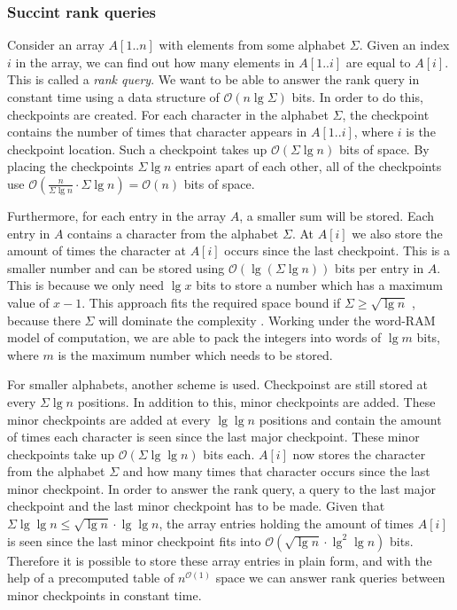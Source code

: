 \subsubsection{Succint rank queries}
\label{sssect:succintrank}
Consider an array $A[1..n]$ with elements from some alphabet $\Sigma$. Given an index $i$ in the array, we can find out how many elements in $A[1..i]$ are equal to $A[i]$. This is called a \emph{rank query}. We want to be able to answer the rank query in constant time using a data structure of $\mathcal{O}(n \lg \Sigma)$ bits. In order to do this, checkpoints are created. For each character in the alphabet $\Sigma$, the checkpoint contains the number of times that character appears in $A[1..i]$, where $i$ is the checkpoint location. Such a checkpoint takes up $\mathcal{O}(\Sigma \lg n)$ bits of space. By placing the checkpoints $\Sigma \lg n$ entries apart of each other, all of the checkpoints use $\mathcal{O}(\frac{n}{\Sigma \lg n} \cdot \Sigma \lg n) = \mathcal{O}(n)$ bits of space.

Furthermore, for each entry in the array $A$, a smaller sum will be stored. Each entry in $A$ contains a character from the alphabet $\Sigma$. At $A[i]$ we also store the amount of times the character at $A[i]$ occurs since the last checkpoint. This is a smaller number and can be stored using $\mathcal{O}(\lg (\Sigma \lg n))$ bits per entry in $A$. This is because we only need $\lg x$ bits to store a number which has a maximum value of $x-1$. This approach fits the required space bound if $\Sigma \geq \sqrt{\lg n}$ , because there $\Sigma$ will dominate the complexity . Working under the word-RAM model of computation, we are able to pack the integers into words of $\lg m$ bits, where $m$ is the maximum number which needs to be stored.

For smaller alphabets, another scheme is used. Checkpoinst are still stored at every $\Sigma \lg n$ positions. In addition to this, minor checkpoints are added. These minor checkpoints are added at every $\lg \lg n$ positions and contain the amount of times each character is seen since the last major checkpoint. These minor checkpoints take up $\mathcal{O}(\Sigma \lg \lg n)$ bits each. $A[i]$ now stores the character from the alphabet $\Sigma$ and how many times that character occurs since the last minor checkpoint. In order to answer the rank query, a query to the last major checkpoint and the last minor checkpoint has to be made. Given that $\Sigma \lg \lg n \leq \sqrt{\lg n} \cdot \lg \lg n$, the array entries holding the amount of times $A[i]$ is seen since the last minor checkpoint fits into $\mathcal{O}(\sqrt{\lg n} \cdot \lg^2 \lg n)$ bits. Therefore it is possible to store these array entries in plain form, and with the help of a precomputed table of $n^{\mathcal{O}(1)}$ space we can answer rank queries between minor checkpoints in constant time.   

